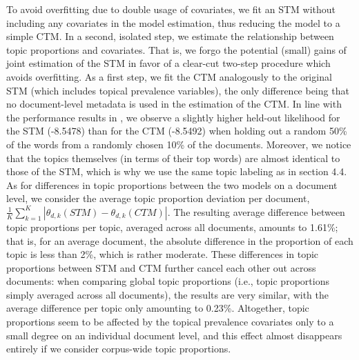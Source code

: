 To avoid overfitting due to double usage of covariates, we fit an STM without including any covariates in the model estimation, thus reducing the model to a simple CTM. In a second, isolated step, we estimate the relationship between topic proportions and covariates. That is, we forgo the potential (small) gains of joint estimation of the STM in favor of a clear-cut two-step procedure which avoids overfitting. As a first step, we fit the CTM analogously to the original STM (which includes topical prevalence variables), the only difference being that no document-level metadata is used in the estimation of the CTM. In line with the performance results in \cite{roberts2016model}, we observe a slightly higher held-out likelihood for the STM (-8.5478) than for the CTM (-8.5492) when holding out a random 50\% of the words from a randomly chosen 10\% of the documents. Moreover, we notice that the topics themselves (in terms of their top words) are almost identical to those of the STM, which is why we use the same topic labeling as in section 4.4. As for differences in topic proportions between the two models on a document level, we consider the average topic proportion deviation per document, $\frac{1}{K}\sum_{k=1}^{K}|\theta_{d,k}(STM)-\theta_{d,k}(CTM)|$. The resulting average difference between topic proportions per topic, averaged across all documents, amounts to 1.61\%; that is, for an average document, the absolute difference in the proportion of each topic is less than 2\%, which is rather moderate. These differences in topic proportions between STM and CTM further cancel each other out across documents: when comparing global topic proportions (i.e., topic proportions simply averaged across all documents), the results are very similar, with the average difference per topic only
amounting to 0.23\%. Altogether, topic proportions seem to be affected by the topical prevalence covariates only to a small degree on an individual document level, and this effect almost disappears entirely if we consider corpus-wide topic proportions.

